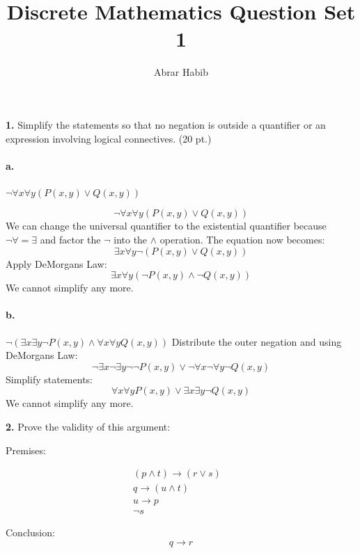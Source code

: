 \documentclass{article} %
\title{Discrete Mathematics Question Set 1}
\author{Abrar Habib}
\begin{document}
    \maketitle %
    
    \textbf{1.} Simplify the statements so that no negation is outside a quantifier or an expression involving logical
    connectives. (20 pt.)

    \paragraph*{a.}
    $\neg \forall x \forall y(P(x,y) \lor Q(x,y))$

    $$\neg \forall x \forall y (P(x,y)\lor Q(x,y))$$
    We can change the universal quantifier to the existential quantifier because $\neg \forall = \exists$ and factor the $\neg$ into the $\land$ operation.
    The equation now becomes:
    $$\exists x \forall y \neg(P(x,y)\lor Q(x,y))$$
    Apply DeMorgans Law:
    $$\exists x \forall y (\neg P(x,y) \land \neg Q(x,y))$$
    We cannot simplify any more.
    \paragraph*{b.}
    $\neg (\exists x \exists y \neg P(x,y)\land \forall x \forall y Q(x,y))$
    Distribute the outer negation and using DeMorgans Law:
    $$\neg \exists x \neg \exists y \neg\neg P(x,y) \lor \neg\forall x \neg\forall y \neg Q(x,y)$$
    Simplify statements:
    $$\forall x \forall y P(x,y) \lor \exists x \exists y \neg Q(x,y)$$
    We cannot simplify any more.

    \newpage
    \textbf{2.} Prove the validity of this argument:

    Premises:

    \begin{align}
        (p \land t) \rightarrow (r \lor s) &\\
        q \rightarrow (u \land t) &\\
        u \rightarrow p &\\
        \neg s
    \end{align}

    Conclusion:
    $$q \rightarrow r$$
    
\end{document}
